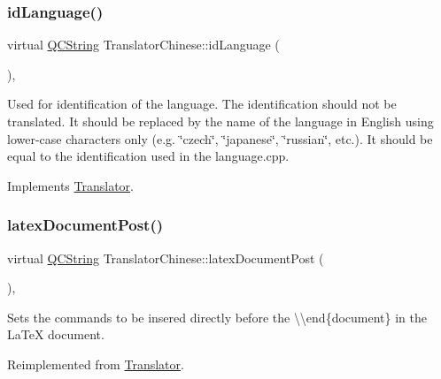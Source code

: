 \subsubsection{\texorpdfstring{idLanguage()}{idLanguage()}}
{\footnotesize\ttfamily virtual \mbox{\hyperlink{class_q_c_string}{Q\+C\+String}} Translator\+Chinese\+::id\+Language (\begin{DoxyParamCaption}{ }\end{DoxyParamCaption})\hspace{0.3cm}{\ttfamily [inline]}, {\ttfamily [virtual]}}

Used for identification of the language. The identification should not be translated. It should be replaced by the name of the language in English using lower-\/case characters only (e.\+g. \char`\"{}czech\char`\"{}, \char`\"{}japanese\char`\"{}, \char`\"{}russian\char`\"{}, etc.). It should be equal to the identification used in the language.\+cpp. 

Implements \mbox{\hyperlink{class_translator}{Translator}}.

\mbox{\label{class_translator_chinese_a86bc64cb27dd2bac8ae17f9cc51800e8}} 
\subsubsection{\texorpdfstring{latexDocumentPost()}{latexDocumentPost()}}
{\footnotesize\ttfamily virtual \mbox{\hyperlink{class_q_c_string}{Q\+C\+String}} Translator\+Chinese\+::latex\+Document\+Post (\begin{DoxyParamCaption}{ }\end{DoxyParamCaption})\hspace{0.3cm}{\ttfamily [inline]}, {\ttfamily [virtual]}}

Sets the commands to be insered directly before the {\ttfamily \textbackslash{}\textbackslash{}end\{document\}} in the La\+TeX document. 

Reimplemented from \mbox{\hyperlink{class_translator_a4bcba7a46f227760b534b35760688da6}{Translator}}.

\mbox{\label{class_translator_chinese_aab889b0b3d8f44915e8b56ecf9e3e5df}} 

